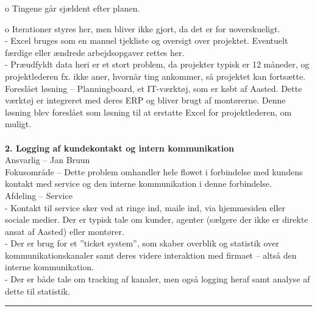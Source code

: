 o Tingene går sjældent efter planen.

o Iterationer styres her, men bliver ikke gjort, da det er for uoverskueligt.\\
- Excel bruges som en manuel tjekliste og oversigt over projektet. Eventuelt færdige eller ændrede arbejdsopgaver rettes her.\\
- Præudfyldt data heri er et stort problem, da projekter typisk er 12 måneder, og projektlederen fx. ikke aner, hvornår ting ankommer, så projektet kan fortsætte.\\
Foreslået løsning – Planningboard, et IT-værktøj, som er købt af Aasted. Dette værktøj er integreret med deres ERP og bliver brugt af montørerne. Denne løsning blev foreslået som løsning til at erstatte Excel for projektlederen, om muligt.\\\\
\textbf{2. Logging af kundekontakt og intern kommunikation}\\
Ansvarlig – Jan Bruun\\
Fokusområde – Dette problem omhandler hele flowet i forbindelse med kundens kontakt med service og den interne kommunikation i denne forbindelse.\\
Afdeling – Service\\
- Kontakt til service sker ved at ringe ind, maile ind, via hjemmesiden eller sociale medier. Der er typisk tale om kunder, agenter (sælgere der ikke er direkte ansat af Aasted) eller montører.\\
- Der er brug for et ”ticket system”, som skaber overblik og statistik over kommunikationskanaler samt deres videre interaktion med firmaet – altså den interne kommunikation.\\
- Der er både tale om tracking af kanaler, men også logging heraf samt analyse af dette til statistik.\\
\hrule